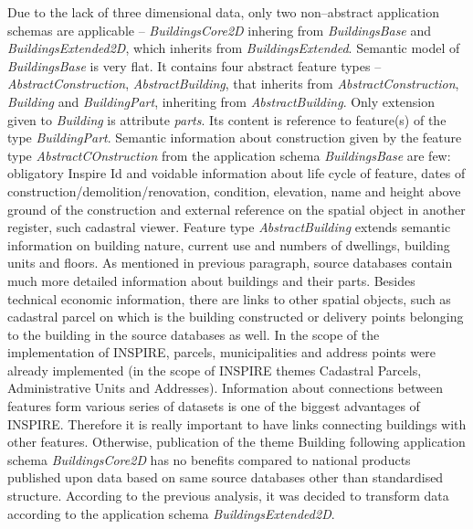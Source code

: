 \documentclass[eprint]{actapoly}
\begin{document}
Due to the lack of three dimensional data, only two non--abstract application schemas are applicable -- \textit{ BuildingsCore2D} inhering from \textit{BuildingsBase} and \textit{BuildingsExtended2D}, which inherits from  \textit{BuildingsExtended}. Semantic model of \textit{BuildingsBase} is very flat. It contains four abstract feature types -- \textit{AbstractConstruction}, \textit{AbstractBuilding}, that inherits from \textit{AbstractConstruction}, \textit{Building} and \textit{BuildingPart}, inheriting from \textit{AbstractBuilding}. Only extension given to \textit{Building} is attribute \textit{parts}. Its content is reference to feature(s) of the type \textit{BuildingPart}. Semantic information about construction given by the feature type \textit{AbstractCOnstruction} from the application schema \textit{BuildingsBase} are few: obligatory Inspire Id and voidable information about life cycle of feature, dates of construction/demolition/renovation, condition, elevation, name and height above ground of the construction and external reference on the spatial object in another register, such cadastral viewer. Feature type \textit{AbstractBuilding} extends semantic information on  building nature, current use and numbers of dwellings, building units and floors. As mentioned in previous paragraph, source databases contain much more detailed information about buildings and their parts. Besides technical economic information, there are links to other spatial objects, such as cadastral parcel on which is the building constructed or delivery points belonging to the building in the source databases as well. In the scope of the implementation of INSPIRE, parcels, municipalities and address points were already implemented (in the scope of INSPIRE themes Cadastral Parcels, Administrative Units and Addresses). Information about connections between features form various series of datasets is one of the biggest advantages of INSPIRE. Therefore it is really important to have links connecting buildings with other features. Otherwise, publication of the theme Building following application schema \textit{BuildingsCore2D} has no benefits compared to national products published upon data based on same source databases other than standardised structure. According to the previous analysis, it was decided to transform data according to the application schema \textit{BuildingsExtended2D}. 
\end{document}
